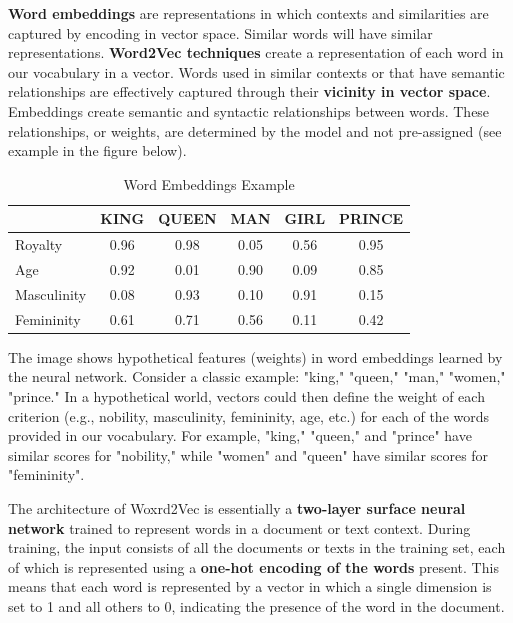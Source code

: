 \textbf{Word embeddings} are representations in which contexts and similarities are captured by encoding in vector space. Similar words will have similar representations. \textbf{Word2Vec techniques} create a representation of each word in our vocabulary in a vector. Words used in similar contexts or that have semantic relationships are effectively captured through their \textbf{vicinity in vector space}. Embeddings create semantic and syntactic relationships between words. These relationships, or weights, are determined by the model and not pre-assigned (see example in the figure below).

\begin{table}[h]
\centering
\begin{tabular}{l|c|c|c|c|c}
& KING & QUEEN & MAN & GIRL & PRINCE \\
\hline
Royalty & \cellcolor{myred!20}0.96 & \cellcolor{myred!20}0.98 & \cellcolor{mygreen!25}0.05 & \cellcolor{myblue!20}0.56 & \cellcolor{myred!20}0.95 \\
Age & \cellcolor{myred!20}0.92 & \cellcolor{mygreen!25}0.01 & \cellcolor{myred!20}0.90 & \cellcolor{mygreen!25}0.09 & \cellcolor{myred!20}0.85 \\
Masculinity & \cellcolor{mygreen!25}0.08 & \cellcolor{myred!20}0.93 & \cellcolor{mygreen!25}0.10 & \cellcolor{myred!20}0.91 & \cellcolor{mygreen!25}0.15 \\
Femininity & \cellcolor{myblue!20}0.61 & \cellcolor{myblue!20}0.71 & \cellcolor{myblue!20}0.56 & \cellcolor{mygreen!25}0.11 & \cellcolor{myblue!25}0.42 \\
\end{tabular}
\caption{Word Embeddings Example}
\end{table}

The image shows hypothetical features (weights) in word embeddings learned by the neural network. Consider a classic example: "king," "queen," "man," "women," "prince." In a hypothetical world, vectors could then define the weight of each criterion (e.g., nobility, masculinity, femininity, age, etc.) for each of the words provided in our vocabulary. For example, "king," "queen," and "prince" have similar scores for "nobility," while "women" and "queen" have similar scores for "femininity".

The architecture of Woxrd2Vec is essentially a \textbf{two-layer surface neural network} trained to represent words in a document or text context. During training, the input consists of all the documents or texts in the training set, each of which is represented using a \textbf{one-hot encoding of the words} present. This means that each word is represented by a vector in which a single dimension is set to 1 and all others to 0, indicating the presence of the word in the document.

